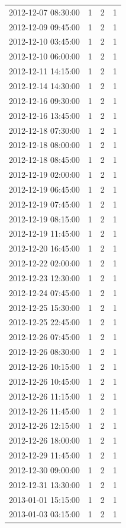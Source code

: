 \begin{tabular}{lrrr}
2012-12-07 08:30:00 & 1 & 2 & 1 \\
2012-12-09 09:45:00 & 1 & 2 & 1 \\
2012-12-10 03:45:00 & 1 & 2 & 1 \\
2012-12-10 06:00:00 & 1 & 2 & 1 \\
2012-12-11 14:15:00 & 1 & 2 & 1 \\
2012-12-14 14:30:00 & 1 & 2 & 1 \\
2012-12-16 09:30:00 & 1 & 2 & 1 \\
2012-12-16 13:45:00 & 1 & 2 & 1 \\
2012-12-18 07:30:00 & 1 & 2 & 1 \\
2012-12-18 08:00:00 & 1 & 2 & 1 \\
2012-12-18 08:45:00 & 1 & 2 & 1 \\
2012-12-19 02:00:00 & 1 & 2 & 1 \\
2012-12-19 06:45:00 & 1 & 2 & 1 \\
2012-12-19 07:45:00 & 1 & 2 & 1 \\
2012-12-19 08:15:00 & 1 & 2 & 1 \\
2012-12-19 11:45:00 & 1 & 2 & 1 \\
2012-12-20 16:45:00 & 1 & 2 & 1 \\
2012-12-22 02:00:00 & 1 & 2 & 1 \\
2012-12-23 12:30:00 & 1 & 2 & 1 \\
2012-12-24 07:45:00 & 1 & 2 & 1 \\
2012-12-25 15:30:00 & 1 & 2 & 1 \\
2012-12-25 22:45:00 & 1 & 2 & 1 \\
2012-12-26 07:45:00 & 1 & 2 & 1 \\
2012-12-26 08:30:00 & 1 & 2 & 1 \\
2012-12-26 10:15:00 & 1 & 2 & 1 \\
2012-12-26 10:45:00 & 1 & 2 & 1 \\
2012-12-26 11:15:00 & 1 & 2 & 1 \\
2012-12-26 11:45:00 & 1 & 2 & 1 \\
2012-12-26 12:15:00 & 1 & 2 & 1 \\
2012-12-26 18:00:00 & 1 & 2 & 1 \\
2012-12-29 11:45:00 & 1 & 2 & 1 \\
2012-12-30 09:00:00 & 1 & 2 & 1 \\
2012-12-31 13:30:00 & 1 & 2 & 1 \\
2013-01-01 15:15:00 & 1 & 2 & 1 \\
2013-01-03 03:15:00 & 1 & 2 & 1 \\

\end{tabular}
